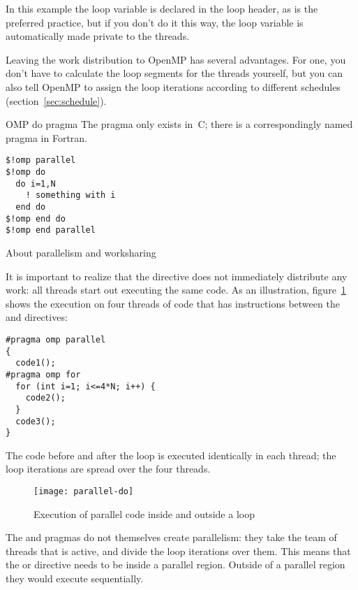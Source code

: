 \begin{remark}
  In this example the loop variable is declared in the loop header,
  as is the preferred practice, but if you don't do it this way,
  the loop variable is automatically made private to the threads.
\end{remark}

Leaving the work distribution to OpenMP has several advantages.
For one, you don't have to calculate the loop segments
for the threads yourself, but you can also tell OpenMP to assign the loop
iterations according to different schedules (section~\ref{sec:schedule}).

\begin{fortrannote}{OMP do pragma}
  The  pragma only exists in~C;
  there is a correspondingly named  pragma in Fortran.
\begin{lstlisting}
$!omp parallel
$!omp do
  do i=1,N
    ! something with i
  end do
$!omp end do
$!omp end parallel
\end{lstlisting}
\end{fortrannote}

 {About parallelism and worksharing}

It is important to realize that the 
directive does not immediately distribute any work:
all threads start out executing the same code.
As an illustration, 
figure~\ref{fig:omp-par-do} shows the execution on four threads of
code that has instructions between the 
and  directives:

\begin{lstlisting}
#pragma omp parallel
{
  code1();
#pragma omp for
  for (int i=1; i<=4*N; i++) {
    code2();
  }
  code3();
}
\end{lstlisting}

The code before and after the loop is executed identically
in each thread; the loop iterations are spread over the four threads.
\begin{figure}[ht]
  \texttt{[image: parallel-do]}
  \caption{Execution of parallel code inside and outside a loop}
  \label{fig:omp-par-do}
\end{figure}

The  and 
pragmas do not themselves create parallelism:
they take the team of threads that is active,
and divide the loop iterations over them.
This means that the  or  directive needs to be
inside a parallel region.
Outside of a parallel region they would execute sequentially.


